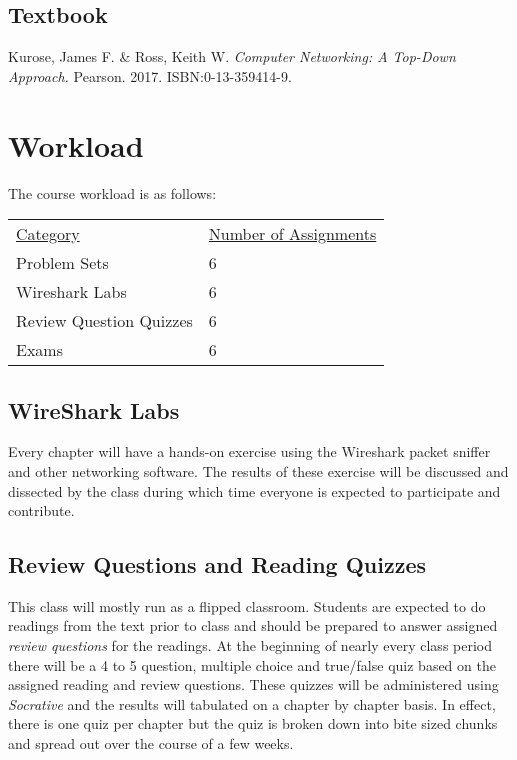\documentclass[10pt]{article}
\begin{document}
\subsection{Textbook}

\noindent
Kurose, James F. \& Ross, Keith W. \textit{Computer Networking: A Top-Down Approach.} Pearson. 2017. ISBN:0-13-359414-9. %


\section{Workload}


The course workload is as follows:

\begin{center}
  \begin{tabular}{ll}
    \underline{Category} & \underline{Number of Assignments} \\
    Problem Sets & 6 \\
    Wireshark Labs & 6 \\
    Review Question Quizzes & 6 \\
    Exams & 6 \\
  \end{tabular}
\end{center}


\subsection*{WireShark Labs}

Every chapter will have a hands-on exercise using the Wireshark packet sniffer and other networking software. The results of these exercise will be discussed and dissected by the class during which time everyone is expected to participate and contribute.


\subsection*{Review Questions and Reading Quizzes}

This class will mostly run as a flipped classroom. Students are expected to do readings from the text prior to class and should be prepared to answer assigned \textit{review questions} for the readings. At the beginning of nearly every class period there will be a 4 to 5 question, multiple choice and true/false quiz based on the assigned reading and review questions. These quizzes will be administered using \textit{Socrative} and the results will tabulated on a chapter by chapter basis.  In effect, there is one quiz per chapter but the quiz is broken down into bite sized chunks and spread out over the course of a few weeks.
\end{document}
